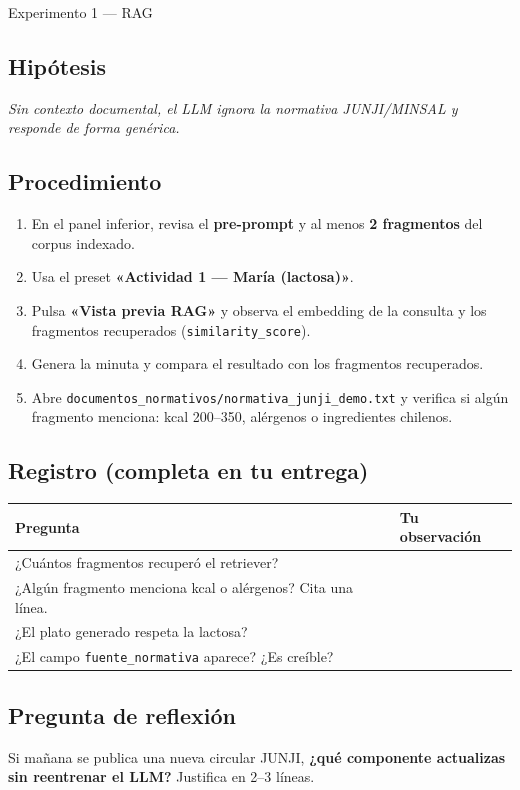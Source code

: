 \documentclass[12pt,a4paper]{article}
\begin{document}
\begin{experbox}{Experimento 1 --- RAG}
\subsection*{Hipótesis}
\textit{Sin contexto documental, el LLM ignora la normativa JUNJI/MINSAL y responde
de forma genérica.}

\subsection*{Procedimiento}
\begin{enumerate}[noitemsep]
  \item En el panel inferior, revisa el \textbf{pre-prompt} y al menos
        \textbf{2 fragmentos} del corpus indexado.
  \item Usa el preset \textbf{«Actividad 1 --- María (lactosa)»}.
  \item Pulsa \textbf{«Vista previa RAG»} y observa el embedding de la consulta
        y los fragmentos recuperados (\texttt{similarity\_score}).
  \item Genera la minuta y compara el resultado con los fragmentos recuperados.
  \item Abre \texttt{documentos\_normativos/normativa\_junji\_demo.txt} y verifica
        si algún fragmento menciona: kcal 200--350, alérgenos o ingredientes chilenos.
\end{enumerate}

\subsection*{Registro (completa en tu entrega)}
\begin{table}[h]
\centering
\small
\begin{tabular}{@{}p{7.2cm}p{6.5cm}@{}}
\toprule
\textbf{Pregunta} & \textbf{Tu observación} \\
\midrule
¿Cuántos fragmentos recuperó el retriever? & \\[1.8ex]
¿Algún fragmento menciona kcal o alérgenos? Cita una línea. & \\[1.8ex]
¿El plato generado respeta la lactosa? & \\[1.8ex]
¿El campo \texttt{fuente\_normativa} aparece? ¿Es creíble? & \\
\bottomrule
\end{tabular}
\end{table}

\subsection*{Pregunta de reflexión}
Si mañana se publica una nueva circular JUNJI, \textbf{¿qué componente actualizas
sin reentrenar el LLM?} Justifica en 2--3 líneas.
\end{experbox}
\end{document}
